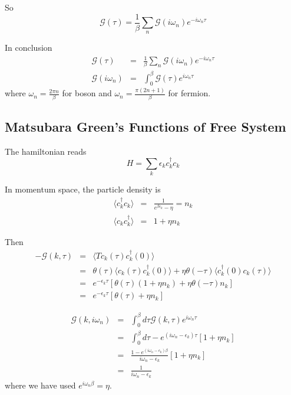 \documentclass[12pt]{book}
\begin{document}
	So
	\begin{equation}
		\mathcal G(\tau)=\frac 1{\beta}\sum_n\mathcal G(i\omega_n)e^{-i\omega_n\tau}
	\end{equation}
	
	In conclusion
	\begin{eqnarray}
		\mathcal G(\tau)&=&\frac 1{\beta}\sum_n\mathcal G(i\omega_n)e^{-i\omega_n\tau}\\
		\mathcal G(i\omega_n)&=&\int_0^\beta\mathcal G(\tau)e^{i\omega_n\tau}
	\end{eqnarray}
	where $\omega_n=\frac{2\pi n}{\beta}$ for boson and $\omega_n=\frac{\pi(2n+1)}{\beta}$ for fermion.
	
	\subsection{Matsubara Green's Functions of Free System}
	
	The hamiltonian reads
	\begin{equation}
		H=\sum_k\epsilon_kc_k^\dagger c_k
	\end{equation}
	
	In momentum space, the particle density is
	\begin{eqnarray}
		\langle c_k^\dagger c_k\rangle&=&\frac1{e^{\beta\epsilon_k}-\eta}=n_k\\
		\langle c_kc_k^\dagger\rangle&=&1+\eta n_k
	\end{eqnarray}
	
	Then
	\begin{eqnarray}
		-\mathcal G(k,\tau)&=&\langle Tc_k(\tau)c_k^\dagger(0)\rangle\\
		&=&\theta(\tau)\langle c_k(\tau)c_k^\dagger(0)\rangle+\eta\theta(-\tau)\langle c_k^\dagger(0)c_k(\tau)\rangle\\
		&=&e^{-\epsilon_k\tau}[\theta(\tau)(1+\eta n_k)+\eta\theta(-\tau)n_k]\\
		&=&e^{-\epsilon_k\tau}[\theta(\tau)+\eta n_k]
	\end{eqnarray}
	
	\begin{eqnarray}
		\mathcal  G(k,i\omega_n)&=&\int_0^\beta d\tau\mathcal G(k,\tau)e^{i\omega_n\tau}\\
		&=&\int_0^\beta d\tau-e^{(i\omega_n-\epsilon_k)\tau}[1+\eta n_k]\\
		&=&\frac{1-e^{(i\omega_n-\epsilon_k)\beta}}{i\omega_n-\epsilon_k}[1+\eta n_k]\\
		&=&\frac1{i\omega_n-\epsilon_k}
	\end{eqnarray}
	where we have used $e^{i\omega_n\beta}=\eta$.
\end{document}
